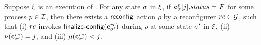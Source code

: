\begin{lemma} %
\label{lem:recon:jump}
Suppose $\EX$ is an execution of \ares{}. 
 For any state $\sigma$ in $\EX$, if $\mathbf{c}^{p}_{\sigma}[j].status = F$ for some process $p\in\mathcal{I}$, 
 then there exists a $\act{reconfig}$ action $\rho$ by a reconfigurer $rc\in\mathcal{G}$, such that
 (i) $rc$ invokes $\act{finalize-config}(\cvec{\rec}{\state'})$ during $\rho$ at some state $\sigma'$ in $\EX$, 
 (ii) $\nu(\mathbf{c}^{rc}_{\sigma'}) = j$, and (iii) $\mu(\mathbf{c}^{rc}_{\sigma'}) < j$. 
% 
\end{lemma}
%

